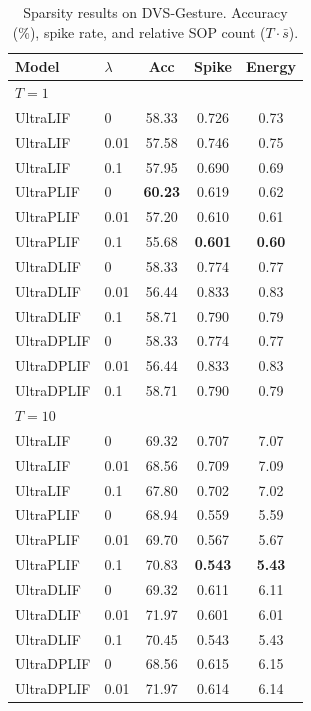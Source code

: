 \documentclass{article}
\theoremstyle{plain}
\theoremstyle{definition}
\theoremstyle{remark}
\begin{document}
\begin{table}[h]
\caption{Sparsity results on DVS-Gesture. Accuracy (\%), spike rate, and relative SOP count ($T \cdot \bar{s}$).}
\label{tab:sparsity_dvs}
\vskip 0.1in
\begin{center}
\begin{small}
\begin{tabular}{llccc}
\toprule
Model & $\lambda$ & Acc & Spike & Energy \\
\midrule
\multicolumn{5}{l}{\textit{$T{=}1$}} \\
UltraLIF   & 0    & 58.33 & 0.726 & 0.73 \\
UltraLIF   & 0.01 & 57.58 & 0.746 & 0.75 \\
UltraLIF   & 0.1  & 57.95 & 0.690 & 0.69 \\
UltraPLIF  & 0    & \textbf{60.23} & 0.619 & 0.62 \\
UltraPLIF  & 0.01 & 57.20 & 0.610 & 0.61 \\
UltraPLIF  & 0.1  & 55.68 & \textbf{0.601} & \textbf{0.60} \\
UltraDLIF  & 0    & 58.33 & 0.774 & 0.77 \\
UltraDLIF  & 0.01 & 56.44 & 0.833 & 0.83 \\
UltraDLIF  & 0.1  & 58.71 & 0.790 & 0.79 \\
UltraDPLIF & 0    & 58.33 & 0.774 & 0.77 \\
UltraDPLIF & 0.01 & 56.44 & 0.833 & 0.83 \\
UltraDPLIF & 0.1  & 58.71 & 0.790 & 0.79 \\
\midrule
\multicolumn{5}{l}{\textit{$T{=}10$}} \\
UltraLIF   & 0    & 69.32 & 0.707 & 7.07 \\
UltraLIF   & 0.01 & 68.56 & 0.709 & 7.09 \\
UltraLIF   & 0.1  & 67.80 & 0.702 & 7.02 \\
UltraPLIF  & 0    & 68.94 & 0.559 & 5.59 \\
UltraPLIF  & 0.01 & 69.70 & 0.567 & 5.67 \\
UltraPLIF  & 0.1  & 70.83 & \textbf{0.543} & \textbf{5.43} \\
UltraDLIF  & 0    & 69.32 & 0.611 & 6.11 \\
UltraDLIF  & 0.01 & 71.97 & 0.601 & 6.01 \\
UltraDLIF  & 0.1  & 70.45 & 0.543 & 5.43 \\
UltraDPLIF & 0    & 68.56 & 0.615 & 6.15 \\
UltraDPLIF & 0.01 & 71.97 & 0.614 & 6.14 \\

\end{tabular}
\end{small}
\end{center}
\end{table}
\end{document}
